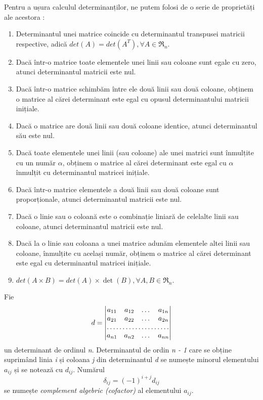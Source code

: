 Pentru a ușura calculul determinanților, ne putem folosi de o serie de
proprietăți ale acestora :
\begin{enumerate}
  \item Determinantul unei matrice coincide cu determinantul transpusei matricii
  respective, adică $det(A) = det(A^{T}), \forall A \in \mathfrak{R}_{n}$.
  \item Dacă într-o matrice toate elementele unei linii sau coloane sunt egale
  cu zero, atunci determinantul matricii este nul.
  \item Dacă într-o matrice schimbăm între ele două linii sau două coloane,
  obținem o matrice al cărei determinant este egal cu opusul determinantului
  matricii inițiale.
  \item Dacă o matrice are două linii sau două coloane identice, atunci
  determinantul său este nul.
  \item Dacă toate elementele unei linii (sau coloane) ale unei matrici sunt
  înmulțite cu un număr $\alpha$, obținem o matrice al cărei determinant este
  egal cu $\alpha$ înmulțit cu determinantul matricei inițiale.
  \item Dacă într-o matrice elementele a două linii sau două coloane sunt
  proporționale, atunci determinantul matricii este nul.
  \item Dacă o linie sau o coloană este o combinație liniară de celelalte linii
  sau coloane, atunci determinantul matricii este nul.
  \item Dacă la o linie sau coloana a unei matrice adunăm elementele altei linii
  sau coloane, înmulțite cu același număr, obținem o matrice al cărei
  determinant este egal cu determinantul matricei inițiale.
  \item $det(A \times B) = det(A) \times \det(B), \forall A, B \in
  \mathfrak{R}_{n}$.
\end{enumerate}

Fie
\begin{equation*}
d = 
\begin{vmatrix}
a_{11} & a_{12} & \dots & a_{1n} \\
a_{21} & a_{22} & \dots & a_{2n} \\
\hdotsfor{4} \\
a_{n1} & a_{n2} & \dots & a_{nn}
\end{vmatrix}
\end{equation*} un determinant de ordinul \textit{n}. Determinantul de ordin
\textit{n - 1} care se obține suprimând linia \textit{i} și coloana \textit{j}
din determinantul \textit{d} se numește minorul elementului $\mathit{a_{ij}}$ și
se notează cu $\mathit{d_{ij}}$. Numărul 
\[
\delta_{ij} = (-1)^{i + j}d_{ij} 
\] se numește \textit{complement algebric (cofactor)} al elementului
$\mathit{a_{ij}}$.

